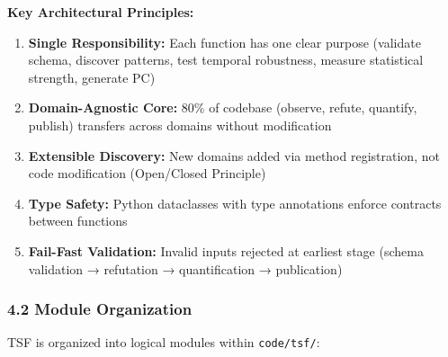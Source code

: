 \documentclass[
]{article}
\begin{document}
\textbf{Key Architectural Principles:}

\begin{enumerate}
\def\labelenumi{\arabic{enumi}.}
\item
  \textbf{Single Responsibility:} Each function has one clear purpose
  (validate schema, discover patterns, test temporal robustness, measure
  statistical strength, generate PC)
\item
  \textbf{Domain-Agnostic Core:} 80\% of codebase (observe, refute,
  quantify, publish) transfers across domains without modification
\item
  \textbf{Extensible Discovery:} New domains added via method
  registration, not code modification (Open/Closed Principle)
\item
  \textbf{Type Safety:} Python dataclasses with type annotations enforce
  contracts between functions
\item
  \textbf{Fail-Fast Validation:} Invalid inputs rejected at earliest
  stage (schema validation → refutation → quantification → publication)
\end{enumerate}

\subsubsection{4.2 Module Organization}\label{module-organization}

TSF is organized into logical modules within \texttt{code/tsf/}:
\end{document}
